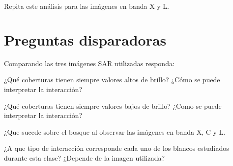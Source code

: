Repita este análisis para las imágenes en banda X y L.

\section{Preguntas disparadoras}

Comparando las tres imágenes SAR utilizadas responda:

\begin{que}
    ¿Qué coberturas tienen siempre valores altos de brillo? ¿Cómo se puede interpretar la interacción?
\end{que}

\begin{que}
    ¿Qué coberturas tienen siempre valores bajos de brillo? ¿Como se puede interpretar la interacción?
\end{que}

\begin{que}
  ¿Que sucede sobre el bosque al observar las imágenes en banda X, C y L.
\end{que}

\begin{que}
  ¿A que tipo de interacción corresponde cada uno de los blancos estudiados durante esta clase? ¿Depende de la imagen utilizada?
\end{que}
